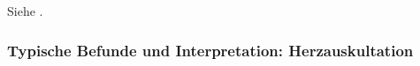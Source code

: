 {Siehe .}
{}
{}
{}
{}




\bigskip
\subsubsection{Typische Befunde und Interpretation:
Herzauskultation} 

\label{topic:herz-auskultation-befunde}

% 
% 
